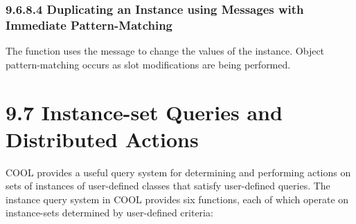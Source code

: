\documentclass[letterpaper,10pt,english]{sphinxmanual}
\begin{document}
\subsubsection{9.6.8.4 Duplicating an Instance using Messages with Immediate Pattern-Matching}
\label{\detokenize{cool:duplicating-an-instance-using-messages-with-immediate-pattern-matching}}
The  function uses the
 message to change the values of the instance.
Object pattern-matching occurs as slot modifications are being
performed.


\begin{sphinxVerbatim}[commandchars=\\\{\}]
  \PYG{p}{[} \PYG{p}{]}
\end{sphinxVerbatim}


\section{9.7 Instance-set Queries and Distributed Actions}
\label{\detokenize{cool:instance-set-queries-and-distributed-actions}}\label{\detokenize{cool:instanceset-queries-and-distributed-actions-1}}
COOL provides a useful query system for determining and performing
actions on sets of instances of user-defined classes that satisfy
user-defined queries. The instance query system in COOL provides six
functions, each of which operate on instance-sets determined by
user-defined criteria:
\end{document}
